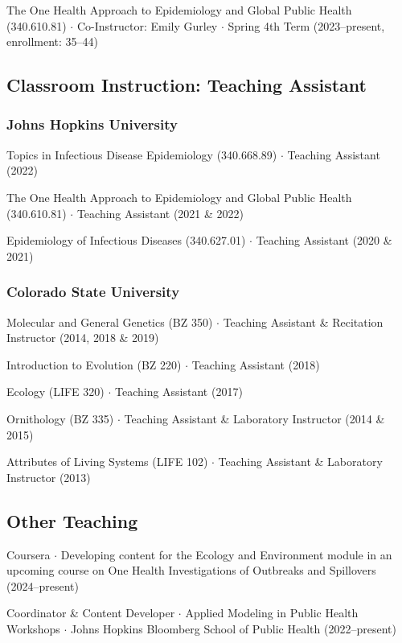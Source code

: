 \documentclass{cv}
\begin{document}
The One Health Approach to Epidemiology and Global Public Health (340.610.81) $\cdot$ Co-Instructor: Emily Gurley $\cdot$ Spring 4th Term (2023--present, enrollment: 35--44)


\subsection*{Classroom Instruction: Teaching Assistant}

\subsubsection*{Johns Hopkins University}

Topics in Infectious Disease Epidemiology (340.668.89) $\cdot$ Teaching Assistant (2022)

The One Health Approach to Epidemiology and Global Public Health (340.610.81) $\cdot$ Teaching Assistant (2021 \& 2022)

Epidemiology of Infectious Diseases (340.627.01) $\cdot$ Teaching Assistant (2020 \& 2021)

\subsubsection*{Colorado State University}

Molecular and General Genetics (BZ 350) $\cdot$ Teaching Assistant \& Recitation Instructor (2014, 2018 \& 2019)

Introduction to Evolution (BZ 220) $\cdot$ Teaching Assistant (2018)

Ecology (LIFE 320) $\cdot$ Teaching Assistant (2017)

Ornithology (BZ 335) $\cdot$ Teaching Assistant \& Laboratory Instructor (2014 \& 2015)

Attributes of Living Systems (LIFE 102) $\cdot$ Teaching Assistant \& Laboratory Instructor (2013)

\subsection*{Other Teaching}

Coursera $\cdot$ Developing content for the Ecology and Environment module in an upcoming course on One Health Investigations of Outbreaks and Spillovers (2024--present)

Coordinator \& Content Developer $\cdot$ Applied Modeling in Public Health Workshops $\cdot$ Johns Hopkins Bloomberg School of Public Health (2022--present)
\end{document}
